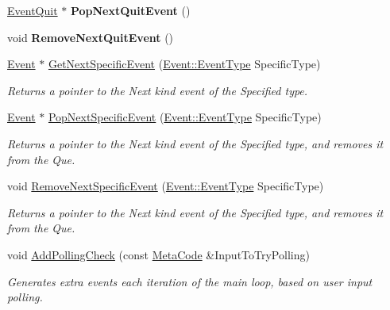 \begin{DoxyCompactItemize}
\item 
\hypertarget{classPhysEventManager_a1def6dcacc5dd8a0d55dd2d47fe89a1c}{
\hyperlink{classphys_1_1EventQuit}{EventQuit} $\ast$ {\bfseries PopNextQuitEvent} ()}
\label{d5/dd7/classPhysEventManager_a1def6dcacc5dd8a0d55dd2d47fe89a1c}

\item 
\hypertarget{classPhysEventManager_accdd3b4047b05b721f77ca68e016baf5}{
void {\bfseries RemoveNextQuitEvent} ()}
\label{d5/dd7/classPhysEventManager_accdd3b4047b05b721f77ca68e016baf5}

\item 
\hyperlink{classphys_1_1Event}{Event} $\ast$ \hyperlink{classPhysEventManager_abf1dd378082dde44e9bcebc900f7edf6}{GetNextSpecificEvent} (\hyperlink{classphys_1_1Event_af5fdbb3e08d8e578d58770fbc606fda7}{Event::EventType} SpecificType)
\begin{DoxyCompactList}\small\item\em Returns a pointer to the Next kind event of the Specified type. \item\end{DoxyCompactList}\item 
\hyperlink{classphys_1_1Event}{Event} $\ast$ \hyperlink{classPhysEventManager_ae1a12ccef3435f164472e6f8c38c77fe}{PopNextSpecificEvent} (\hyperlink{classphys_1_1Event_af5fdbb3e08d8e578d58770fbc606fda7}{Event::EventType} SpecificType)
\begin{DoxyCompactList}\small\item\em Returns a pointer to the Next kind event of the Specified type, and removes it from the Que. \item\end{DoxyCompactList}\item 
void \hyperlink{classPhysEventManager_a0984ae7ac0cc0db9fb24e50156497de4}{RemoveNextSpecificEvent} (\hyperlink{classphys_1_1Event_af5fdbb3e08d8e578d58770fbc606fda7}{Event::EventType} SpecificType)
\begin{DoxyCompactList}\small\item\em Returns a pointer to the Next kind event of the Specified type, and removes it from the Que. \item\end{DoxyCompactList}\item 
void \hyperlink{classPhysEventManager_a1e99385441c5377a741561db581ef3ae}{AddPollingCheck} (const \hyperlink{classphys_1_1MetaCode}{MetaCode} \&InputToTryPolling)
\begin{DoxyCompactList}\small\item\em Generates extra events each iteration of the main loop, based on user input polling. \item\end{DoxyCompactList}\item 

\end{DoxyCompactItemize}
